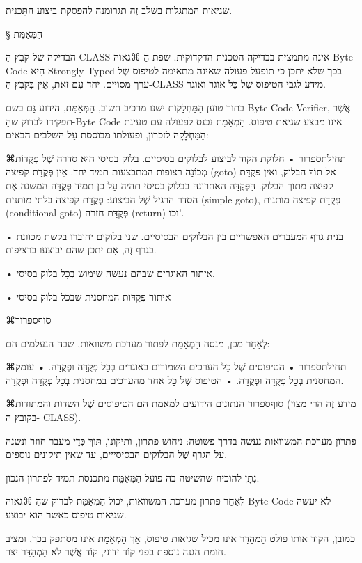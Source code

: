 שגיאות המתגלות בשלב זֶה תגרומנה להפסקת ביצוע הַתָּכְנִית.

§ הַמְּאַמֵּת

הבדיקה שֶׁל קֹבֶץ הַ-CLASS אינה מתמצית בבדיקה הטכנית הדקדוקית. שפת הַ-⌘גאוה Byte
Code הִיא Strongly Typed בכך שלא יתכן כי תופעל פעולה שאינה מתאימה לטיפוס שֶׁל
ערך מסויים. יחד עִם זאת, אֵין בְּקֹבֶץ הַ-CLASS מידע לגבי הטיפוס שֶׁל כָּל אוגר
ואוגר.

בתוך טוען הַמַּחְלָקוֹת ישנו מרכיב חשוב, הַמְּאַמֵּת, הידוע גַּם בשם Byte Code
Verifier, אֲשֶׁר תפקידו לבדוק שהַ-Byte Code אינו מבצע שגיאת טיפוס. הַמְּאַמֵּת
נכנס לפעולה עִם טעינת הַמַּחְלָקָה לזכרון, ופעולתו מבוססת עַל השלבים הבאים:

⌘תחילת{ספרור}
• חלוקת הקוד לביצוע לבלוקים בסיסיים. בלוק בסיסי הוּא סדרה שֶׁל פְּקֻדּוֹת
מְכוֹנָה רצופות המתבצעות תמיד יחד. אֵין פְּקֻדַּת קפיצה (goto) אל תּוֹךְ הבלוק,
ואין פְּקֻדַּת קפיצה מתוך הבלוק. הַפְּקֻדָּה האחרונה בבלוק בסיסי תהיה עַל כן
תמיד פְּקֻדָּה המשנה אֶת הסדר הרגיל שֶׁל הביצוע: פְּקֻדַּת קפיצה בלתי מותנית
(simple goto), פְּקֻדַּת קפיצה מותנית (conditional goto) פְּקֻדַּת חזרה
(return) וכו'.

• בנית גרף המעברים האפשריים בין הבלוקים הבסיסיים. שני בלוקים יחוברו בקשת מכוונת
בגרף זֶה, אִם יתכן שהם יבוצעו ברציפות.

• איתור האוגרים שבהם נעשה שימוש בְּכָל בלוק בסיסי.

• איתור פְּקֻדּוֹת המחסנית שבכל בלוק בסיסי

⌘סוף{ספרור}

לְאַחַר מכן, מנסה הַמְּאַמֵּת לפתור מערכת משוואות, שבה הנעלמים הם:

⌘תחילת{ספרור}
• הטיפוסים שֶׁל כָּל הערכים השמורים באוגרים בְּכָל פְּקֻדָּה וּפְקֻדָּה.
• עומק המחסנית בְּכָל פְּקֻדָּה וּפְקֻדָּה.
• הטיפוס שֶׁל כָּל אחד מהערכים במחסנית בְּכָל פְּקֻדָּה וּפְקֻדָּה.

⌘סוף{ספרור}
הנתונים הידועים למאמת הם הטיפוסים שֶׁל השדות והמתודות (מידע זֶה הרי מצוי בקובץ
הַ- CLASS).

פתרון מערכת המשוואות נעשה בדרך פשוטה: ניחוש פתרון, ותיקונו, תּוֹךְ כְּדֵי מעבר
חוזר ונשנה עַל הגרף שֶׁל הבלוקים הבסיסייים, עד שאין תיקונים נוספים.

נִתָּן להוכיח שהשיטה בה פועל הַמְּאַמֵּת מתכנסת תמיד לפתרון הנכון.

לְאַחַר פתרון מערכת המשוואות, יכול הַמְּאַמֵּת לבדוק שהַ-⌘גאוה Byte Code לֹא יעשה
שגיאות טיפוס כאשר הוּא יבוצע.

כמובן, הקוד אותו פולט הַמְּהַדֵּר אינו מכיל שגיאות טיפוס, אַךְ הַמְּאַמֵּת אינו
מסתפק בכך, ומציב חומת הגנה נוספת בפני קוֹד זדוני, קוֹד אֲשֶׁר לֹא הַמְהַדֵּר
יצר.

